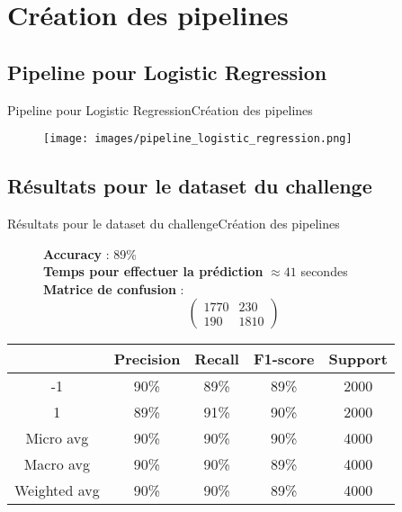 \documentclass[usenames,dvipsnames]{beamer}
\begin{document}
\section{Création des pipelines}
\subsection{Pipeline pour Logistic Regression}
\begin{frame}{Pipeline pour Logistic Regression}{Création des pipelines}
\begin{figure}[!ht]
  \centering
  \texttt{[image: images/pipeline\_logistic\_regression.png]}
\end{figure}
\end{frame}

\subsection{Résultats pour le dataset du challenge}
\begin{frame}{Résultats pour le dataset du challenge}{Création des pipelines}
\begin{figure}[!ht]
  \centering
  \textbf{Accuracy} : 89\% \\
  \textbf{Temps pour effectuer la prédiction} $\approx41$ secondes \\
  \textbf{Matrice de confusion} :
  $$
  \begin{pmatrix}
  1770 & 230 \\
  190 & 1810
  \end{pmatrix}
  $$
\end{figure}

\begin{table}
  \centering
  \begin{tabular}{|c||c|c|c|c|}
    \hline
     & \textbf{Precision} & \textbf{Recall} & \textbf{F1-score} & \textbf{Support}\\
    \hline
    \hline
    -1 & 90\% & 89\% & 89\% & 2000\\
    \hline
    1 & 89\% & 91\% & 90\% & 2000\\
    \hline
    Micro avg & 90\% & 90\% & 90\% & 4000\\
    \hline
    Macro avg & 90\% & 90\% & 89\% & 4000\\
    \hline
    Weighted avg & 90\% & 90\% & 89\% & 4000\\
    \hline
  \end{tabular}
\end{table}
\end{frame}
\end{document}
